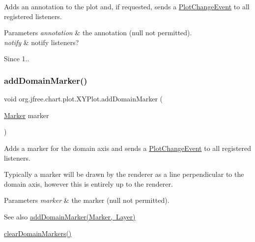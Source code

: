 Adds an annotation to the plot and, if requested, sends a \mbox{\hyperlink{}{Plot\+Change\+Event}} to all registered listeners.


\begin{DoxyParams}{Parameters}
{\em annotation} & the annotation ({\ttfamily null} not permitted). \\
\hline
{\em notify} & notify listeners?\\
\hline
\end{DoxyParams}
\begin{DoxySince}{Since}
1.. 
\end{DoxySince}
\mbox{\label{classorg_1_1jfree_1_1chart_1_1plot_1_1_x_y_plot_aef4dcf846a69ccf394a1421ef80d6d0f}} 
\subsubsection{\texorpdfstring{add\+Domain\+Marker()}{addDomainMarker()}\hspace{0.1cm}{\footnotesize\ttfamily [1/4]}}
{\footnotesize\ttfamily void org.\+jfree.\+chart.\+plot.\+X\+Y\+Plot.\+add\+Domain\+Marker (\begin{DoxyParamCaption}\item[{\mbox{\hyperlink{classorg_1_1jfree_1_1chart_1_1plot_1_1_marker}{Marker}}}]{marker }\end{DoxyParamCaption})}

Adds a marker for the domain axis and sends a \mbox{\hyperlink{}{Plot\+Change\+Event}} to all registered listeners. 

Typically a marker will be drawn by the renderer as a line perpendicular to the domain axis, however this is entirely up to the renderer.


\begin{DoxyParams}{Parameters}
{\em marker} & the marker ({\ttfamily null} not permitted).\\
\hline
\end{DoxyParams}
\begin{DoxySeeAlso}{See also}
\mbox{\hyperlink{classorg_1_1jfree_1_1chart_1_1plot_1_1_x_y_plot_ada13a42961574a3ea22db269e2f205b9}{add\+Domain\+Marker(\+Marker, Layer)}} 

\mbox{\hyperlink{classorg_1_1jfree_1_1chart_1_1plot_1_1_x_y_plot_a0b3732025a192e27fdf6e45543d9aa4f}{clear\+Domain\+Markers()}} 
\end{DoxySeeAlso}
\mbox{\label{classorg_1_1jfree_1_1chart_1_1plot_1_1_x_y_plot_ada13a42961574a3ea22db269e2f205b9}} 
